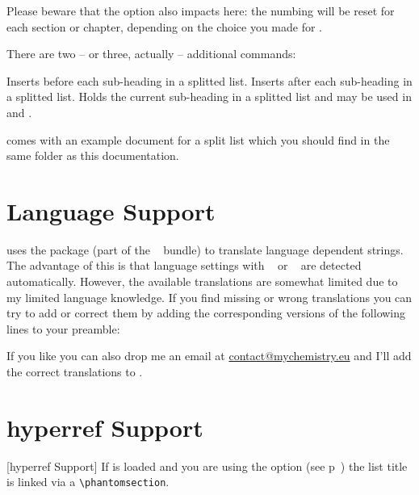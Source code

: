 \documentclass[toc=bib,toc=index]{cnpkgdoc}
\makeatletter
\providecommand*\sinceversion[1]{%
  \@bsphack
  \marginnote{%
    \footnotesize\sffamily\RaggedRight
    \textcolor{black!75}{Introduced in version~#1}}%
  \@esphack}
\makeatother
\begin{document}
Please beware that the option  also impacts here: the numbing will
be reset for each section or chapter, depending on the choice you made for
.

\sinceversion{0.7}There are two -- or three, actually -- additional commands:
\begin{beschreibung}
 \newline
   Inserts  before each sub-heading in a splitted list.
 \newline
   Inserts  after each sub-heading in a splitted list.
 \newline
   Holds the current sub-heading in a splitted list and may be used in
    and .
\end{beschreibung}


\enotez comes with an example document for a split list which you should
find in the same folder as this documentation.

\section{Language Support}
\enotez uses the  package (part of the
~\cite{pkg:exsheets} bundle) to translate language dependent
strings. The advantage of this is that language settings with
~\cite{pkg:babel} or ~\cite{pkg:polyglossia}
are detected automatically. However, the available translations are somewhat
limited due to my limited language knowledge. If you find missing or wrong
translations you can try to add or correct them by adding the corresponding
versions of the following lines to your preamble:
\begin{beispiel}
\end{beispiel}
If you like you can also drop me an email at
\href{mailto:contact@mychemistry.eu}{contact@mychemistry.eu} and I'll add the
correct translations to \enotez.

\section{hyperref Support}[hyperref Support]
If  is loaded and you are using the option  (see
p~\pageref{key:totoc}) the list title is linked via a \verb=\phantomsection=.
\end{document}
